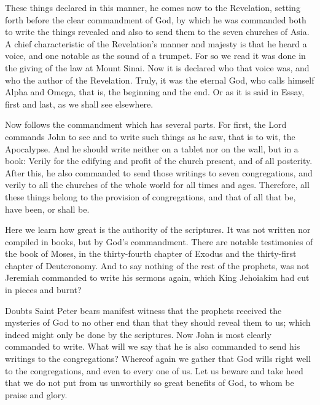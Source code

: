 These things declared in this manner, he comes now to the Revelation, setting forth before the clear commandment of God, by which he was commanded both to write the things revealed and also to send them to the seven churches of Asia. A chief characteristic of the Revelation’s manner and majesty is that he heard a voice, and one notable as the sound of a trumpet. For so we read it was done in the giving of the law at Mount Sinai. Now it is declared who that voice was, and who the author of the Revelation. Truly, it was the eternal God, who calls himself Alpha and Omega, that is, the beginning and the end. Or as it is said in Essay, first and last, as we shall see elsewhere.

Now follows the commandment which has several parts. For first, the Lord commands John to see and to write such things as he saw, that is to wit, the Apocalypse. And he should write neither on a tablet nor on the wall, but in a book: Verily for the edifying and profit of the church present, and of all posterity. After this, he also commanded to send those writings to seven congregations, and verily to all the churches of the whole world for all times and ages. Therefore, all these things belong to the provision of congregations, and that of all that be, have been, or shall be.

Here we learn how great is the authority of the scriptures. It was not written nor compiled in books, but by God’s commandment. There are notable testimonies of the book of Moses, in the thirty-fourth chapter of Exodus and the thirty-first chapter of Deuteronomy. And to say nothing of the rest of the prophets, was not Jeremiah commanded to write his sermons again, which King Jehoiakim had cut in pieces and burnt?

Doubts Saint Peter bears manifest witness that the prophets received the mysteries of God to no other end than that they should reveal them to us; which indeed might only be done by the scriptures. Now John is most clearly commanded to write. What will we say that he is also commanded to send his writings to the congregations? Whereof again we gather that God wills right well to the congregations, and even to every one of us. Let us beware and take heed that we do not put from us unworthily so great benefits of God, to whom be praise and glory.
